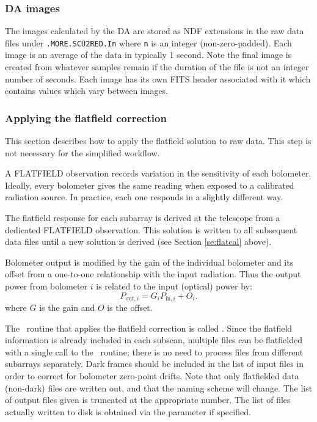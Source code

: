 \documentclass[oneside,11pt]{starlink}
\begin{document}
\subsubsection{DA images}

The images calculated by the DA are stored as NDF extensions in the
raw data files under \texttt{.MORE.SCU2RED.In} where \texttt{n} is an
integer (non-zero-padded). Each image is an average of the data in
typically 1 second. Note the final image is created from whatever
samples remain if the duration of the file is not an integer number of
seconds. Each image has its own FITS header associated with it which
contains values which vary between images.

\subsubsection{Applying the flatfield correction\label{se:flatfield}}

This section describes how to apply the flatfield solution to raw
data. This step is not necessary for the simplified workflow.

A FLATFIELD observation records variation in the sensitivity of each
bolometer. Ideally, every bolometer gives the same reading when
exposed to a calibrated radiation source. In practice, each one
responds in a slightly different way.

The flatfield response for each subarray is derived at the telescope
from a dedicated FLATFIELD observation. This solution is written to
all subsequent data files until a new solution is derived (see Section
\ref{se:flatcal} above).

Bolometer output is modified by the gain of the individual bolometer
and its offset from a one-to-one relationship with the input
radiation. Thus the output power from bolometer $i$ is related to the
input (optical) power by:
\begin{equation}
P_{{\textrm{out}},i} = G_i P_{{\textrm{in}},i} + O_i.
\end{equation}
where $G$ is the gain and $O$ is the offset.

The \SMURF\ routine that applies the flatfield correction is called
\flatfield. Since the flatfield information is already included in
each subscan, multiple files can be flatfielded with a single call to
the \flatfield\ routine; there is no need to process files from
different subarrays separately. Dark frames should be included in the
list of input files in order to correct for bolometer zero-point
drifts. Note that only flatfielded data (non-dark) files are written
out, and that the naming scheme will change. The list of output files
given is truncated at the appropriate number. The list of files
actually written to disk is obtained via the 
parameter if specified.
\end{document}

